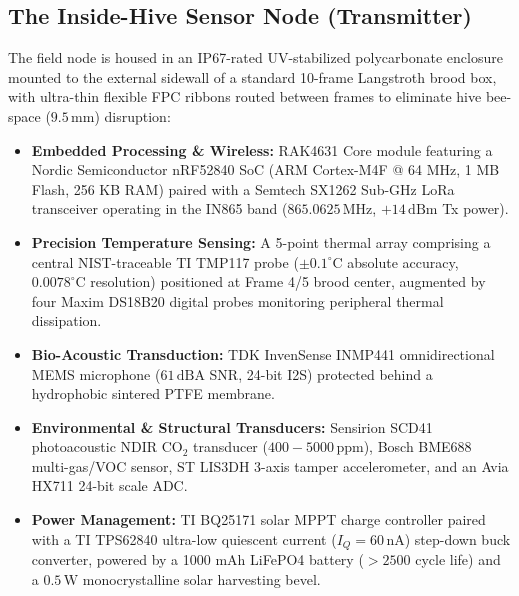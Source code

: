 \documentclass[10pt,conference,letterpaper]{IEEEtran}
\begin{document}
\subsection{The Inside-Hive Sensor Node (Transmitter)}
The field node is housed in an IP67-rated UV-stabilized polycarbonate enclosure mounted to the external sidewall of a standard 10-frame Langstroth brood box, with ultra-thin flexible FPC ribbons routed between frames to eliminate hive bee-space ($9.5\,\text{mm}$) disruption:
\begin{itemize}
    \item \textbf{Embedded Processing \& Wireless:} RAK4631 Core module featuring a Nordic Semiconductor nRF52840 SoC (ARM Cortex-M4F @ 64 MHz, 1 MB Flash, 256 KB RAM) paired with a Semtech SX1262 Sub-GHz LoRa transceiver operating in the IN865 band ($865.0625\,\text{MHz}$, $+14\,\text{dBm}$ Tx power).
    \item \textbf{Precision Temperature Sensing:} A 5-point thermal array comprising a central NIST-traceable TI TMP117 probe ($\pm0.1^\circ\text{C}$ absolute accuracy, $0.0078^\circ\text{C}$ resolution) positioned at Frame 4/5 brood center, augmented by four Maxim DS18B20 digital probes monitoring peripheral thermal dissipation.
    \item \textbf{Bio-Acoustic Transduction:} TDK InvenSense INMP441 omnidirectional MEMS microphone ($61\,\text{dBA}$ SNR, 24-bit I2S) protected behind a hydrophobic sintered PTFE membrane.
    \item \textbf{Environmental \& Structural Transducers:} Sensirion SCD41 photoacoustic NDIR $\text{CO}_2$ transducer ($400 - 5000\,\text{ppm}$), Bosch BME688 multi-gas/VOC sensor, ST LIS3DH 3-axis tamper accelerometer, and an Avia HX711 24-bit scale ADC.
    \item \textbf{Power Management:} TI BQ25171 solar MPPT charge controller paired with a TI TPS62840 ultra-low quiescent current ($I_Q = 60\,\text{nA}$) step-down buck converter, powered by a 1000 mAh LiFePO4 battery ($>2500$ cycle life) and a $0.5\,\text{W}$ monocrystalline solar harvesting bevel.
\end{itemize}
\end{document}
